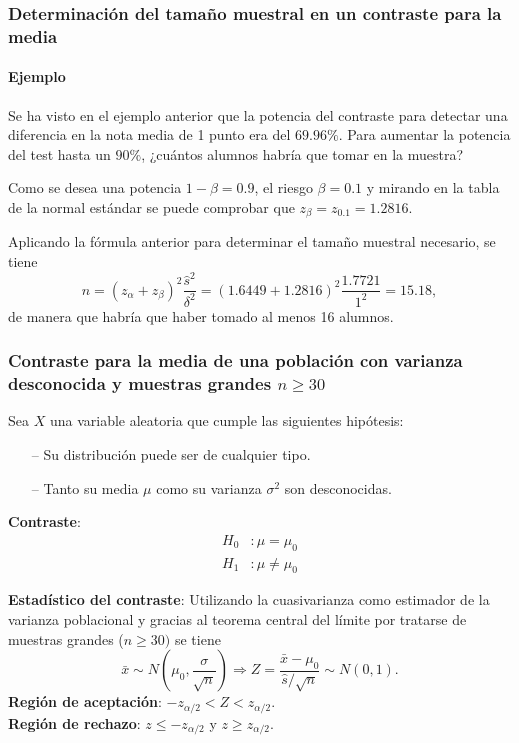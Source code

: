 \begin{frame}
\frametitle{Determinación del tamaño muestral en un contraste para la media}
\framesubtitle{Ejemplo}
Se ha visto en el ejemplo anterior que la potencia del contraste para detectar una diferencia en la nota media de 1 punto era del $69.96\%$. Para aumentar la potencia del test hasta un $90\%$, ¿cuántos alumnos habría que tomar en la muestra?


Como se desea una potencia $1-\beta=0.9$, el riesgo $\beta=0.1$ y mirando en la tabla de la normal estándar se puede comprobar que $z_\beta = z_{0.1}=1.2816$.

Aplicando la fórmula anterior para determinar el tamaño muestral necesario, se tiene
\[
n = (z_\alpha+z_\beta)^2\frac{\hat s^2}{\delta^2} = (1.6449+1.2816)^2\frac{1.7721}{1^2} = 15.18,
\]
de manera que habría que haber tomado al menos 16 alumnos.
\end{frame}


\begin{frame}
\frametitle{Contraste para la media de una población con varianza desconocida y muestras grandes $n\geq 30$}
Sea $X$ una variable aleatoria que cumple las siguientes hipótesis:
\begin{itemize}
\item[--] Su distribución puede ser de cualquier tipo.
\item[--] Tanto su media $\mu$ como su varianza $\sigma^2$ son desconocidas.
\end{itemize}
\textbf{Contraste}:
\begin{align*}
H_0 &: \mu=\mu_0\\
H_1 &: \mu\neq \mu_0
\end{align*}

\textbf{Estadístico del contraste}: Utilizando la cuasivarianza como estimador de la varianza poblacional y gracias al teorema central del límite por tratarse de muestras grandes ($n\geq 30)$ se tiene
\[
\bar x\sim N\left(\mu_0,\frac{\sigma}{\sqrt{n}}\right) \Rightarrow Z=\frac{\bar x-\mu_0}{\hat s/\sqrt{n}}\sim N(0,1).
\]
\textbf{Región de aceptación}: $-z_{\alpha/2}< Z < z_{\alpha/2}$.\\
\textbf{Región de rechazo}: $z\leq -z_{\alpha/2}$ y $z\geq z_{\alpha/2}$.
\end{frame}


